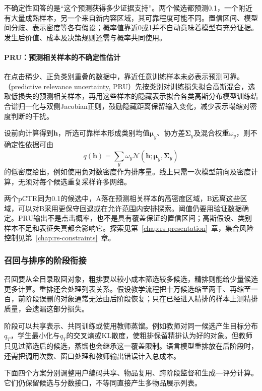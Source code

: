 不确定性回答的是“这个预测获得多少证据支持”。两个候选都预测0.1，一个附近有大量成熟样本，另一个来自新内容区域，其可靠程度可能不同。置信区间、模型间分歧、表示密度等各有假设；概率值靠近0或1并不自动意味着模型有充分证据。发生后价值、成本及决策规则还需与概率共同使用。

\paragraph{PRU：预测相关样本的不确定性估计}
\label{sec:rs-pru}

在点击稀少、正负类别重叠的数据中，靠近任意训练样本未必表示预测可靠。（predictive relevance uncertainty, PRU）先按类别对训练损失拟合高斯混合，选取低损失的预测相关样本，再用这些样本的隐藏表示拟合各类高斯分布模型训练结合谱归一化与双侧Jacobian正则，鼓励隐藏距离保留输入变化，减少表示塌缩对密度判断的干扰。

设前向计算得到$\bm h$，所选可靠样本形成类别均值$\bm\mu_y$、协方差$\bm\Sigma_y$及混合权重$\omega_y$，则不确定性依据可由
\[
 q(\bm h)=\sum_y\omega_y
   \mathcal N(\bm h;\bm\mu_y,\bm\Sigma_y)
\]
的低密度给出，例如使用负对数密度作为排序量。线上只需一次模型前向及密度计算，无须对每个候选重复采样许多网络。

两个pCTR同为0.1的候选中，A落在预测相关样本的高密度区域，B远离这些区域，可以对B采用更保守回退或在允许范围内安排探索。阈值仍要用验证数据确定。PRU输出不是点击概率，也不是具有覆盖保证的置信区间；高斯假设、类别样本不足和表征失真都会影响它。探索见第~\ref{chap:rs-presentation}~章，集合风险控制见第~\ref{chap:rs-constraints}~章。

\subsubsection{召回与排序的阶段衔接}
\label{sec:rs-stage-connection}

召回要从全目录取回对象，粗排要以较小成本筛选较多候选，精排则能给少量候选更多计算。重排还会处理列表关系。假设教学流程把十万候选缩至两千、再缩至一百，前阶段误删的对象通常无法由后阶段恢复；只在已经进入精排的样本上测精排质量，会遗漏这部分损失。

阶段可以共享表示、共同训练或使用教师蒸馏。例如教师对同一候选产生目标分布$q_T$，学生最小化与$q_T$的交叉熵或KL散度，使粗排保留精排认为好的对象。但教师只见过筛选后的候选，蒸馏也会继承这一覆盖限制。语言模型重排放在后阶段时，还需把调用次数、窗口处理和教师输出错误计入总成本。

下面四个方案分别调整用户编码共享、物品复用、跨阶段监督和生成—评分计算。它们仍保留候选与分数接口，不等同直接产生多物品展示列表。


